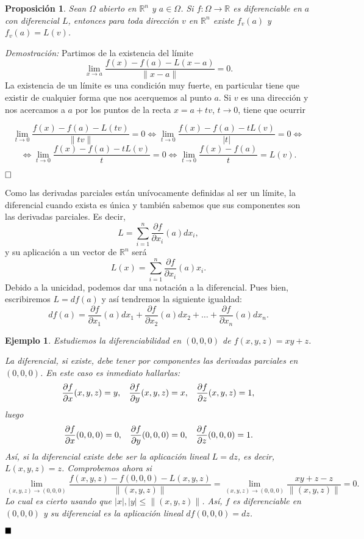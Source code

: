 \documentclass[12pt]{article}
\newtheorem{proposition}[theorem]{Proposición}
\newtheorem{example}{Ejemplo}[theorem]
\providecommand{\norm}[1]{\lVert#1\rVert}
\begin{document}
\begin{proposition}Sean $\Omega$ abierto en $\mathbb{R}^n$ y $a \in \Omega$. Si $f \colon \Omega \longrightarrow \mathbb{R}$ es diferenciable en $a$ con diferencial $L$, entonces para toda dirección $v$ en $\mathbb{R}^n$ existe $f_v(a)$ y $f_v(a)= L(v)$.
\end{proposition}
\emph{Demostración: }Partimos de la existencia del límite $$\lim_{x\rightarrow a} \dfrac{f(x)-f(a)-L(x-a)}{\norm{x-a}} = 0.$$
La existencia de un límite es una condición muy fuerte, en particular tiene que existir de cualquier forma que nos acerquemos al punto $a$. Si $v$ es una dirección y nos acercamos a $a$ por los puntos de la recta $x = a+tv$, $t \longrightarrow 0$, tiene que ocurrir \begin{center}$$\lim_{t\rightarrow 0} \dfrac{f(x)-f(a)-L(tv)}{\norm{tv}} = 0 \Leftrightarrow \lim_{t\rightarrow 0} \dfrac{f(x)-f(a)-tL(v)}{|t|} = 0 \Leftrightarrow$$ $$\Leftrightarrow \lim_{t\rightarrow 0} \dfrac{f(x)-f(a)-tL(v)}{t}=0 \Leftrightarrow \lim_{t\rightarrow 0} \dfrac{f(x)-f(a)}{t} = L(v).$$\end{center}

$\hfill \square$

Como las derivadas parciales están unívocamente definidas al ser un límite, la diferencial cuando exista es única y también sabemos que sus componentes son las derivadas parciales. Es decir, $$L = \sum_{i=1}^n \dfrac{\partial f}{\partial x_i}(a)dx_i,$$ y su aplicación a un vector de $\mathbb{R}^n$ será $$L(x) = \sum_{i=1}^n\dfrac{\partial f}{\partial x_i}(a)x_i.$$
Debido a la unicidad, podemos dar una notación a la diferencial. Pues bien, escribiremos $L = df(a)$ y así tendremos la siguiente igualdad: $$df(a)= \dfrac{\partial f}{\partial x_1}(a)dx_1 + \dfrac{\partial f}{\partial x_2}(a)dx_2 + \ldots + \dfrac{\partial f}{\partial x_n}(a) dx_n.$$

\begin{example}Estudiemos la diferenciabilidad en $(0,0,0)$ de $f(x,y,z)=xy+z$.

La diferencial, si existe, debe tener por componentes las derivadas parciales en $(0,0,0)$. En este caso es inmediato hallarlas: $$\dfrac{\partial f}{\partial x}(x,y,z)=y, \hspace{0.3cm} \dfrac{\partial f}{\partial y}(x,y,z)=x, \hspace{0.3cm} \dfrac{\partial f}{\partial z} (x,y,z)=1,$$ luego $$\dfrac{\partial f}{\partial x}(0,0,0)=0, \hspace{0.3cm} \dfrac{\partial f}{\partial y}(0,0,0)=0, \hspace{0.3cm} \dfrac{\partial f}{\partial z} (0,0,0)=1.$$ Así, si la diferencial existe debe ser la aplicación lineal $L = dz$, es decir, $L(x,y,z)=z$. Comprobemos ahora si $$\lim_{(x,y,z)\rightarrow (0,0,0)} \dfrac{f(x,y,z)-f(0,0,0)-L(x,y,z)}{\norm{(x,y,z)}} = \lim_{(x,y,z)\rightarrow(0,0,0)} \dfrac{xy+z-z}{\norm{(x,y,z)}} = 0.$$
Lo cual es cierto usando que $|x|,|y| \leq \norm{(x,y,z)}$. Así, $f$ es diferenciable en $(0,0,0)$ y su diferencial es la aplicación lineal $df(0,0,0) = dz$.
\end{example}
$\hfill \blacksquare$
\end{document}
